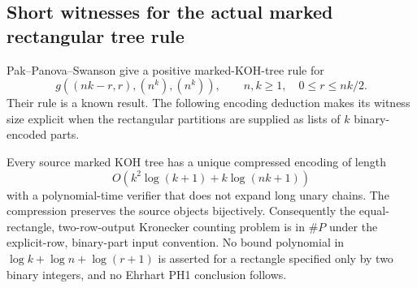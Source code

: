 \subsection{Short witnesses for the actual marked rectangular tree rule}
Pak--Panova--Swanson \cite[Theorem~4.5, p.~10]{PPS} give a positive
marked-KOH-tree rule for
\[
 g((nk-r,r),(n^k),(n^k)),\qquad
 n,k\ge1,\quad 0\le r\le nk/2.
\]
Their rule is a known result. The following encoding deduction makes
its witness size explicit when the rectangular partitions are supplied
as lists of $k$ binary-encoded parts.

\begin{finding}\label{f:kohcompression}
Every source marked KOH tree has a unique compressed encoding of length
\[
 O\!\left(k^2\log(k+1)+k\log(nk+1)\right)
\]
with a polynomial-time verifier that does not expand long unary chains.
The compression preserves the source objects bijectively.
Consequently the equal-rectangle, two-row-output Kronecker counting
problem is in $\#P$ under the explicit-row, binary-part input convention.
No bound polynomial in $\log k+\log n+\log(r+1)$ is asserted for a
rectangle specified only by two binary integers, and no Ehrhart PH1
conclusion follows.
\end{finding}
